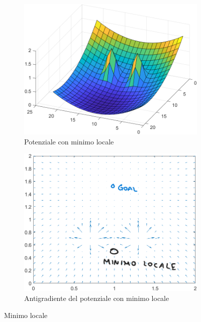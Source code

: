 \documentclass[14pt,a4paper]{extarticle}
\begin{document}
\begin{figure}[H]
\begin{subfigure}[t]{0.5\textwidth}
\caption{Potenziale con minimo locale}
\includegraphics[width=\textwidth]{minimoLocale.png}
\end{subfigure}
\hfill
\begin{subfigure}[t]{0.5\textwidth}
\caption{Antigradiente del potenziale con minimo locale}
\includegraphics[width=\textwidth]{antigradMinimoLocale.png}
\end{subfigure}
\caption{Minimo locale}
\label{minloc}
\end{figure}
\end{document}

